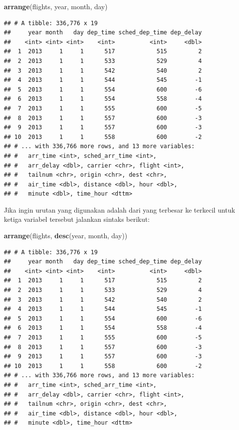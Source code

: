 \documentclass[]{book}
\newenvironment{Shaded}{\begin{snugshade}}{\end{snugshade}}
\newcommand{\KeywordTok}[1]{\textcolor[rgb]{0.13,0.29,0.53}{\textbf{#1}}}
\newcommand{\NormalTok}[1]{#1}
\begin{document}
\begin{Shaded}
\begin{Highlighting}[]
\KeywordTok{arrange}\NormalTok{(flights, year, month, day)}
\end{Highlighting}
\end{Shaded}

\begin{verbatim}
## # A tibble: 336,776 x 19
##     year month   day dep_time sched_dep_time dep_delay
##    <int> <int> <int>    <int>          <int>     <dbl>
##  1  2013     1     1      517            515         2
##  2  2013     1     1      533            529         4
##  3  2013     1     1      542            540         2
##  4  2013     1     1      544            545        -1
##  5  2013     1     1      554            600        -6
##  6  2013     1     1      554            558        -4
##  7  2013     1     1      555            600        -5
##  8  2013     1     1      557            600        -3
##  9  2013     1     1      557            600        -3
## 10  2013     1     1      558            600        -2
## # ... with 336,766 more rows, and 13 more variables:
## #   arr_time <int>, sched_arr_time <int>,
## #   arr_delay <dbl>, carrier <chr>, flight <int>,
## #   tailnum <chr>, origin <chr>, dest <chr>,
## #   air_time <dbl>, distance <dbl>, hour <dbl>,
## #   minute <dbl>, time_hour <dttm>
\end{verbatim}

Jika ingin urutan yang digunakan adalah dari yang terbesar ke terkecil
untuk ketiga variabel tersebut jalankan sintaks berikut:

\begin{Shaded}
\begin{Highlighting}[]
\KeywordTok{arrange}\NormalTok{(flights, }\KeywordTok{desc}\NormalTok{(year, month, day))}
\end{Highlighting}
\end{Shaded}

\begin{verbatim}
## # A tibble: 336,776 x 19
##     year month   day dep_time sched_dep_time dep_delay
##    <int> <int> <int>    <int>          <int>     <dbl>
##  1  2013     1     1      517            515         2
##  2  2013     1     1      533            529         4
##  3  2013     1     1      542            540         2
##  4  2013     1     1      544            545        -1
##  5  2013     1     1      554            600        -6
##  6  2013     1     1      554            558        -4
##  7  2013     1     1      555            600        -5
##  8  2013     1     1      557            600        -3
##  9  2013     1     1      557            600        -3
## 10  2013     1     1      558            600        -2
## # ... with 336,766 more rows, and 13 more variables:
## #   arr_time <int>, sched_arr_time <int>,
## #   arr_delay <dbl>, carrier <chr>, flight <int>,
## #   tailnum <chr>, origin <chr>, dest <chr>,
## #   air_time <dbl>, distance <dbl>, hour <dbl>,
## #   minute <dbl>, time_hour <dttm>
\end{verbatim}
\end{document}

